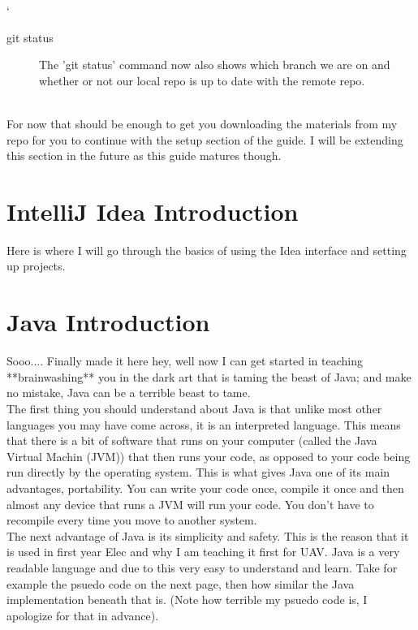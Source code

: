 `\documentclass[a4paper,11pt]{report}
\begin{document}
\begin{description}
\begin{description}
							\item[git status]
								The 'git status' command now also shows which branch we are on and whether or not our local repo is up to date with the remote repo.\\\\

							\end{description}

							For now that should be enough to get you downloading the materials from my repo for you to continue with the setup section of the guide. I will be extending this section in the future as this guide matures though.

				\chapter{IntelliJ Idea Introduction}
					Here is where I will go through the basics of using the Idea interface and setting up projects.

				\chapter{Java Introduction}
					Sooo.... Finally made it here hey, well now I can get started in teaching **brainwashing** you in the dark art that is taming the beast of Java; and make no mistake, Java can be a terrible beast to tame.\\
					The first thing you should understand about Java is that unlike most other languages you may have come across, it is an interpreted language. This means that there is a bit of software that runs on your computer (called the Java Virtual Machin (JVM)) that then runs your code, as opposed to your code being run directly by the operating system.
					This is what gives Java one of its main advantages, portability. You can write your code once, compile it once and then almost any device that runs a JVM will run your code. You don't have to recompile every time you move to another system.\\
					The next advantage of Java is its simplicity and safety. This is the reason that it is used in first year Elec and why I am teaching it first for UAV. Java is a very readable language and due to this very easy to understand and learn.
					Take for example the psuedo code on the next page, then how similar the Java implementation beneath that is. (Note how terrible my psuedo code is, I apologize for that in advance).

					\pagebreak


\end{description}
\end{document}
